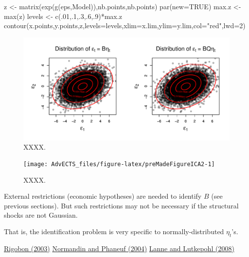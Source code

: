 \documentclass[
]{book}
\newenvironment{Shaded}{\begin{snugshade}}{\end{snugshade}}
\newcommand{\AttributeTok}[1]{\textcolor[rgb]{0.77,0.63,0.00}{#1}}
\newcommand{\ConstantTok}[1]{\textcolor[rgb]{0.00,0.00,0.00}{#1}}
\newcommand{\DecValTok}[1]{\textcolor[rgb]{0.00,0.00,0.81}{#1}}
\newcommand{\FunctionTok}[1]{\textcolor[rgb]{0.00,0.00,0.00}{#1}}
\newcommand{\NormalTok}[1]{#1}
\newcommand{\OtherTok}[1]{\textcolor[rgb]{0.56,0.35,0.01}{#1}}
\newcommand{\SpecialCharTok}[1]{\textcolor[rgb]{0.00,0.00,0.00}{#1}}
\newcommand{\StringTok}[1]{\textcolor[rgb]{0.31,0.60,0.02}{#1}}
\theoremstyle{definition}
\theoremstyle{definition}
\theoremstyle{definition}
\theoremstyle{definition}
\theoremstyle{remark}
\begin{document}
\begin{Shaded}
\begin{Highlighting}[]
\NormalTok{z }\OtherTok{\textless{}{-}} \FunctionTok{matrix}\NormalTok{(}\FunctionTok{exp}\NormalTok{(}\FunctionTok{g}\NormalTok{(eps,Model)),nb.points,nb.points)}
\FunctionTok{par}\NormalTok{(}\AttributeTok{new=}\ConstantTok{TRUE}\NormalTok{)}
\NormalTok{max.z }\OtherTok{\textless{}{-}} \FunctionTok{max}\NormalTok{(z)}
\NormalTok{levels }\OtherTok{\textless{}{-}} \FunctionTok{c}\NormalTok{(.}\DecValTok{01}\NormalTok{,.}\DecValTok{1}\NormalTok{,.}\DecValTok{3}\NormalTok{,.}\DecValTok{6}\NormalTok{,.}\DecValTok{9}\NormalTok{)}\SpecialCharTok{*}\NormalTok{max.z}
\FunctionTok{contour}\NormalTok{(x.points,y.points,z,}\AttributeTok{levels=}\NormalTok{levels,}\AttributeTok{xlim=}\NormalTok{x.lim,}\AttributeTok{ylim=}\NormalTok{y.lim,}\AttributeTok{col=}\StringTok{"red"}\NormalTok{,}\AttributeTok{lwd=}\DecValTok{2}\NormalTok{)}
\end{Highlighting}
\end{Shaded}

\begin{figure}
\includegraphics[width=0.95\linewidth]{images/Figure_A} \caption{XXXX.}\label{fig:preMadeFigureICA}
\end{figure}

\begin{figure}
\texttt{[image: AdvECTS\_files/figure-latex/preMadeFigureICA2-1]} \caption{XXXX.}\label{fig:preMadeFigureICA2}
\end{figure}

External restrictions (economic hypotheses) are needed to identify \(B\) (see previous sections). But such restrictions may not be necessary if the structural shocks are not Gaussian.

That is, the identification problem is very specific to normally-distributed \(\eta_t\)'s.

\href{https://www.mitpressjournals.org/doi/abs/10.1162/003465303772815727?journalCode=rest}{Rigobon (2003)}
\href{https://www.sciencedirect.com/science/article/abs/pii/S0304393204000698}{Normandin and Phaneuf (2004)}
\href{https://onlinelibrary.wiley.com/doi/abs/10.1111/j.1538-4616.2008.00151.x}{Lanne and Lutkepohl (2008)}
\end{document}
